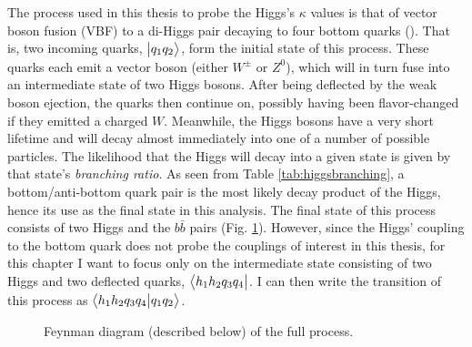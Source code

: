     The process used in this thesis to probe the Higgs's $\kappa$ values is that of
        vector boson fusion (VBF) to a di-Higgs pair decaying to four bottom quarks (\vbfhhproc).
    That is, two incoming quarks, $\big| q_1 q_2 \big>$, form the initial state of this process.
    These quarks each emit a vector boson (either $W^{\pm}$ or $Z^0$), 
        which will in turn fuse into an intermediate state of two Higgs bosons.
    After being deflected by the weak boson ejection, the quarks then continue on,
        possibly having been flavor-changed if they emitted a charged $W$.
    Meanwhile, the Higgs bosons have a very short lifetime and will decay almost immediately into one of a number of possible particles.
    The likelihood that the Higgs will decay into a given state is given by that state's \textit{branching ratio}.
    As seen from Table \ref{tab:higgsbranching}, a bottom/anti-bottom quark pair is the most likely decay product of the Higgs,
        hence its use as the final state in this analysis.
    The final state of this process consists of two Higgs and the $b \bar{b}$ pairs (Fig. \ref{fig:tree_level_vbfhh4b}).
    However, since the Higgs' coupling to the bottom quark does not probe the couplings of interest in this thesis,
        for this chapter I want to focus only on the intermediate state
        consisting of two Higgs and two deflected quarks,
            $\big< h_1 h_2 q_3 q_4 \big|$.
    I can then write the transition of this process as $\big<  h_1 h_2 q_3 q_4 \big| q_1 q_2 \big>$.

    \begin{figure} \centering
         
        \caption{Feynman diagram (described below) of the full \vbfhhproc process.}
        \label{fig:tree_level_vbfhh4b}
    \end{figure}

    

